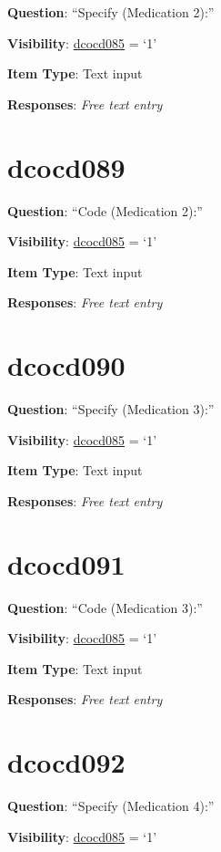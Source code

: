 \documentclass[]{book}
\begin{document}
\textbf{Question}: ``Specify (Medication 2):''

\textbf{Visibility}: \protect\hyperlink{dcocd085}{dcocd085} = `1'

\textbf{Item Type}: Text input

\textbf{Responses}: \emph{Free text entry}

\hypertarget{dcocd089}{%
\section{dcocd089}\label{dcocd089}}

\textbf{Question}: ``Code (Medication 2):''

\textbf{Visibility}: \protect\hyperlink{dcocd085}{dcocd085} = `1'

\textbf{Item Type}: Text input

\textbf{Responses}: \emph{Free text entry}

\hypertarget{dcocd090}{%
\section{dcocd090}\label{dcocd090}}

\textbf{Question}: ``Specify (Medication 3):''

\textbf{Visibility}: \protect\hyperlink{dcocd085}{dcocd085} = `1'

\textbf{Item Type}: Text input

\textbf{Responses}: \emph{Free text entry}

\hypertarget{dcocd091}{%
\section{dcocd091}\label{dcocd091}}

\textbf{Question}: ``Code (Medication 3):''

\textbf{Visibility}: \protect\hyperlink{dcocd085}{dcocd085} = `1'

\textbf{Item Type}: Text input

\textbf{Responses}: \emph{Free text entry}

\hypertarget{dcocd092}{%
\section{dcocd092}\label{dcocd092}}

\textbf{Question}: ``Specify (Medication 4):''

\textbf{Visibility}: \protect\hyperlink{dcocd085}{dcocd085} = `1'
\end{document}
